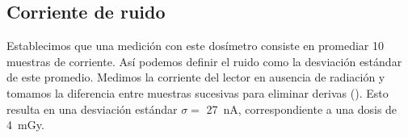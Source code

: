 \subsection{Corriente de ruido}
Establecimos que una medición con este dosímetro consiste en promediar 10
muestras de corriente.
Así podemos definir el ruido como la desviación estándar de este promedio.
Medimos la corriente del lector en ausencia de radiación y
tomamos la diferencia entre muestras sucesivas para eliminar derivas
().
Esto resulta en una desviación estándar
$\sigma=$ \SI{27}{\nano\ampere},
correspondiente a una dosis de \SI{4}{\milli\gray}.
